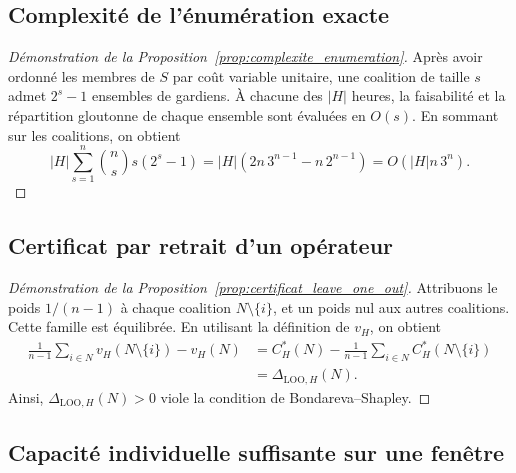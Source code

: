 \subsection{Complexité de l'énumération exacte}
\label{app:preuve_complexite_enumeration}

\begin{proof}[Démonstration de la Proposition~\ref{prop:complexite_enumeration}]
Après avoir ordonné les membres de \(S\) par coût variable unitaire, une
coalition de taille \(s\) admet \(2^s-1\) ensembles de gardiens. À chacune
des \(|H|\) heures, la faisabilité et la répartition gloutonne de chaque
ensemble sont évaluées en \(O(s)\). En sommant sur les coalitions, on obtient
\[
|H|\sum_{s=1}^{n}\binom ns s(2^s-1)
=|H|\left(2n\,3^{n-1}-n\,2^{n-1}\right)
=O(|H|n\,3^n).
\]
\end{proof}

\subsection{Certificat par retrait d'un opérateur}
\label{app:preuve_leave_one_out}

\begin{proof}[Démonstration de la Proposition~\ref{prop:certificat_leave_one_out}]
Attribuons le poids \(1/(n-1)\) à chaque coalition
\(N\setminus\{i\}\), et un poids nul aux autres coalitions. Cette famille est
équilibrée. En utilisant la définition de \(v_H\), on obtient
\begin{align*}
    \frac{1}{n-1}\sum_{i\in N}v_H(N\setminus\{i\})-v_H(N)
    &=
    C_H^*(N)
    -
    \frac{1}{n-1}
    \sum_{i\in N}C_H^*(N\setminus\{i\})\\
    &=
    \Delta_{\mathrm{LOO},H}(N).
\end{align*}
Ainsi, \(\Delta_{\mathrm{LOO},H}(N)>0\) viole la condition de
Bondareva--Shapley.
\end{proof}

\subsection{Capacité individuelle suffisante sur une fenêtre}
\label{app:preuve_capacite_coeur}
\label{app:preuve_capacite_fenetre}

